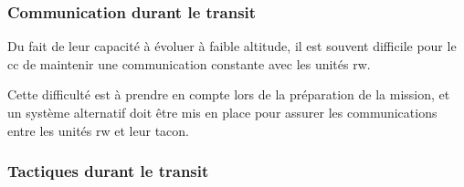 \subsubsection{Communication durant le transit}

\begin{e1}
	\item
	Du fait de leur capacité à évoluer à faible altitude, il est souvent difficile pour le \gls{cc} de maintenir une communication constante avec les unités \gls{rw}.
	\item
	Cette difficulté est à prendre en compte lors de la préparation de la mission,  et un système alternatif doit être mis en place pour assurer les communications entre les unités \gls{rw} et leur \gls{tacon}.
\end{e1}

\subsubsection{Tactiques durant le transit}

